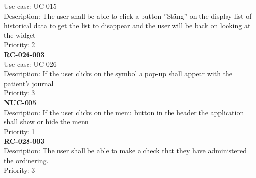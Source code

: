 Use case: UC-015 \\
Description: The user shall be able to click a button ”Stäng” on the display list of historical data to get the list to disappear and the user will be back on looking at the widget \\
Priority: 2 \\
\newline
\textbf{RC-026-003} \\
Use case: UC-026 \\
Description: If the user clicks on the symbol a pop-up shall appear with the patient’s journal \\
Priority: 3 \\
\newline
\textbf{NUC-005} \\
Description: If the user clicks on the menu button in the header the application shall show or hide the menu \\
Priority: 1 \\
\newline
\textbf{RC-028-003} \\
Description: The user shall be able to make a check that they have administered the ordinering.  \\
Priority: 3 \\
\newline





